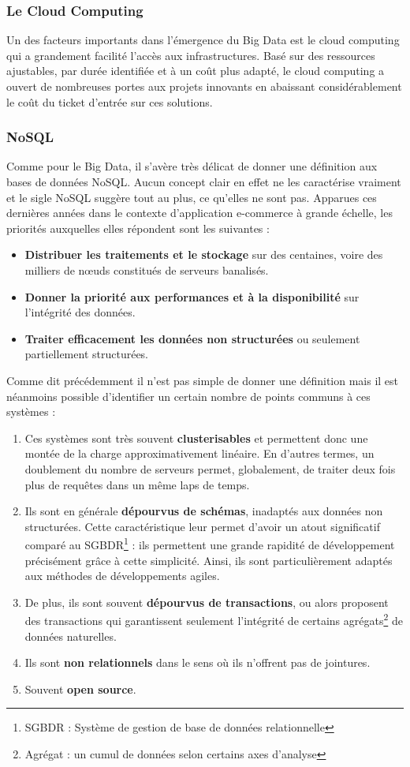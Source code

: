 \documentclass[12pt]{article}
\begin{document}
\subsubsection{Le Cloud Computing}
Un des facteurs importants dans l'émergence du Big Data est le cloud computing qui a grandement facilité l'accès aux infrastructures. Basé sur des ressources ajustables, par durée identifiée et à un coût plus adapté, le cloud computing a ouvert de nombreuses portes aux projets innovants en abaissant considérablement le coût du ticket d'entrée sur ces solutions.
\subsubsection{NoSQL}
Comme pour le Big Data, il s'avère très délicat de donner une définition aux bases de données NoSQL. Aucun concept clair en effet ne les caractérise vraiment et le sigle NoSQL suggère tout au plus, ce qu'elles ne sont pas. Apparues ces dernières années dans le contexte d'application e-commerce à grande échelle, les priorités auxquelles elles répondent sont les suivantes : 
\begin{itemize}
\item \textbf{Distribuer les traitements et le stockage} sur des centaines, voire des milliers de nœuds constitués de serveurs banalisés.
\item \textbf{Donner la priorité aux performances et à la disponibilité} sur l'intégrité des données.
\item \textbf{Traiter efficacement les données non structurées} ou seulement partiellement structurées.
\end{itemize}
\vspace{0.4cm}
Comme dit précédemment il n’est pas simple de donner une définition mais il est néanmoins possible d'identifier un certain nombre de points communs à ces systèmes : 
\begin{enumerate}
\item Ces systèmes sont très souvent \textbf{clusterisables} et permettent donc une montée de la charge approximativement linéaire. En d'autres termes, un doublement du nombre de serveurs permet, globalement, de traiter deux fois plus de requêtes dans un même laps de temps.
\item Ils sont en générale \textbf{dépourvus de schémas}, inadaptés aux données non structurées. Cette caractéristique leur permet d'avoir un atout significatif comparé au SGBDR\footnote{SGBDR : Système de gestion de base de données relationnelle} : ils permettent une grande rapidité de développement précisément grâce à cette simplicité. Ainsi, ils sont particulièrement adaptés aux méthodes de développements agiles.
\item De plus, ils sont souvent \textbf{dépourvus de transactions}, ou alors proposent des transactions qui garantissent seulement l'intégrité de certains agrégats\footnote{Agrégat : un cumul de données selon certains axes d'analyse} de données naturelles.
\item Ils sont \textbf{non relationnels} dans le sens où ils n'offrent pas de jointures.
\item Souvent \textbf{open source}.
\end{enumerate} 
\end{document}
